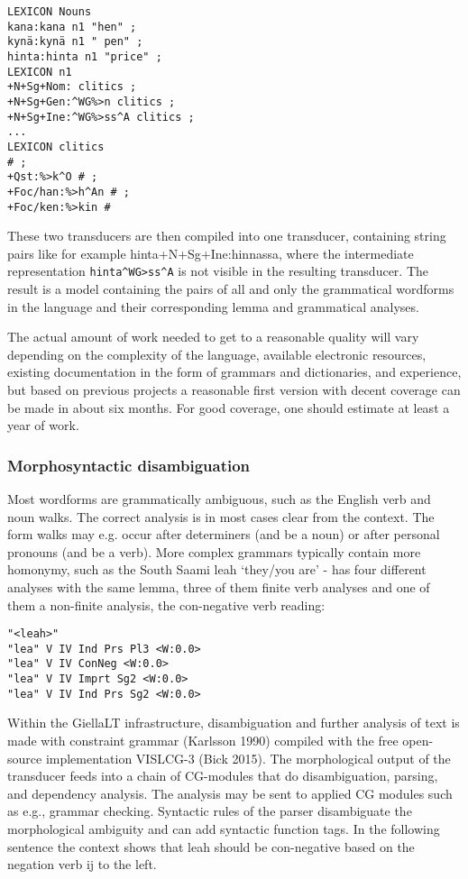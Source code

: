 \documentclass[free]{flammie}
\begin{document}
\begin{verbatim}
LEXICON Nouns
kana:kana n1 "hen" ;
kynä:kynä n1 " pen" ;
hinta:hinta n1 "price" ;
LEXICON n1
+N+Sg+Nom: clitics ;
+N+Sg+Gen:^WG%>n clitics ;
+N+Sg+Ine:^WG%>ss^A clitics ;
...
LEXICON clitics
# ;
+Qst:%>k^O # ;
+Foc/han:%>h^An # ;
+Foc/ken:%>kin #
\end{verbatim}

These two transducers are then compiled into one transducer, containing string pairs like
for example hinta+N+Sg+Ine:hinnassa, where the intermediate representation
\verb|hinta^WG>ss^A| is not visible in the resulting transducer. The result is a model containing
the pairs of all and only the grammatical wordforms in the language and their corresponding lemma and grammatical analyses.

The actual amount of work needed to get to a reasonable quality will vary depending on
the complexity of the language, available electronic resources, existing documentation in
the form of grammars and dictionaries, and experience, but based on previous projects a
reasonable first version with decent coverage can be made in about six months. For good
coverage, one should estimate at least a year of work.

\subsubsection{Morphosyntactic disambiguation}

Most wordforms are grammatically ambiguous, such as the English verb and noun walks.
The correct analysis is in most cases clear from the context. The form walks may e.g. occur
after determiners (and be a noun) or after personal pronouns (and be a verb). More complex
grammars typically contain more homonymy, such as the South Saami leah ‘they/you are’
- has four different analyses with the same lemma, three of them finite verb analyses and
one of them a non-finite analysis, the con-negative verb reading:

\begin{verbatim}
"<leah>"
"lea" V IV Ind Prs Pl3 <W:0.0>
"lea" V IV ConNeg <W:0.0>
"lea" V IV Imprt Sg2 <W:0.0>
"lea" V IV Ind Prs Sg2 <W:0.0>
\end{verbatim}

Within the GiellaLT infrastructure, disambiguation and further analysis of text is made
with constraint grammar (Karlsson 1990) compiled with the free open-source implementation VISLCG-3 (Bick 2015). The morphological output of the transducer feeds into a chain
of CG-modules that do disambiguation, parsing, and dependency analysis. The analysis
may be sent to applied CG modules such as e.g., grammar checking.
Syntactic rules of the parser disambiguate the morphological ambiguity and can add
syntactic function tags. In the following sentence the context shows that leah should be
con-negative based on the negation verb ij to the left.
\end{document}
